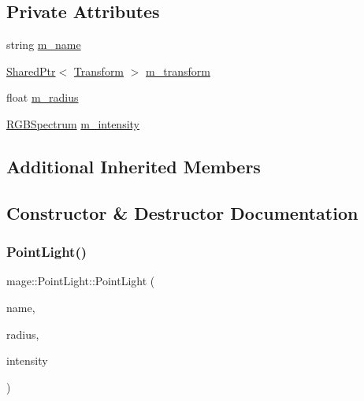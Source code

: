 \subsection*{Private Attributes}
\begin{DoxyCompactItemize}
\item 
string \hyperlink{structmage_1_1_point_light_a96a5802cc2b06df700f63f8e8a9683eb}{m\+\_\+name}
\item 
\hyperlink{namespacemage_a1e01ae66713838a7a67d30e44c67703e}{Shared\+Ptr}$<$ \hyperlink{structmage_1_1_transform}{Transform} $>$ \hyperlink{structmage_1_1_point_light_a080be38309dd4dba28ac0fc65d99756e}{m\+\_\+transform}
\item 
float \hyperlink{structmage_1_1_point_light_a04459adec2eaadc457799e4399b5df1f}{m\+\_\+radius}
\item 
\hyperlink{structmage_1_1_r_g_b_spectrum}{R\+G\+B\+Spectrum} \hyperlink{structmage_1_1_point_light_ac021a08c4c700c3b19de5f7491a80e4f}{m\+\_\+intensity}
\end{DoxyCompactItemize}
\subsection*{Additional Inherited Members}


\subsection{Constructor \& Destructor Documentation}
\hypertarget{structmage_1_1_point_light_ac9d479055720799816d0489669cbd986}{}\label{structmage_1_1_point_light_ac9d479055720799816d0489669cbd986} 
\subsubsection{\texorpdfstring{Point\+Light()}{PointLight()}\hspace{0.1cm}{\footnotesize\ttfamily [1/2]}}
{\footnotesize\ttfamily mage\+::\+Point\+Light\+::\+Point\+Light (\begin{DoxyParamCaption}\item[{const string}]{name,  }\item[{float}]{radius,  }\item[{const \hyperlink{structmage_1_1_r_g_b_spectrum}{R\+G\+B\+Spectrum} \&}]{intensity }\end{DoxyParamCaption})}

